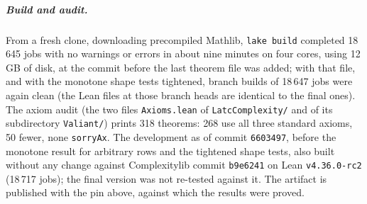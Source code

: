 \documentclass[a4paper,UKenglish,cleveref,autoref,thm-restate]{lipics-v2021}
\begin{document}
\subparagraph*{Build and audit.}
From a fresh clone, downloading precompiled Mathlib, \texttt{lake build} completed 18\,645 jobs
with no warnings or errors in about nine minutes on four cores, using 12\,GB of disk, at the
commit before the last theorem file was added; with that file, and with the monotone shape tests
tightened, branch builds of 18\,647 jobs were again clean (the Lean files at those branch heads
are identical to the final ones). The axiom audit (the two files \texttt{Axioms.lean} of \texttt{LatcComplexity/} and of
its subdirectory \texttt{Valiant/}) prints 318 theorems: 268 use all three standard axioms, 50
fewer, none \lstinline{sorryAx}. The development as of commit \texttt{6603497}, before the
monotone result for arbitrary rows and the tightened shape tests, also built without any change
against Complexitylib commit \texttt{b9e6241} on Lean \texttt{v4.36.0-rc2} (18\,717 jobs); the
final version was not re-tested against it. The artifact is published with the pin above,
against which the results were proved.

\end{document}
